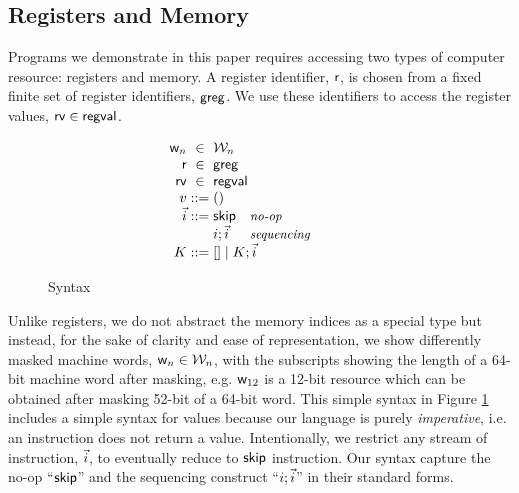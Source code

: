 \subsection{Registers and Memory}
Programs we demonstrate in this paper requires accessing two types of computer resource: registers and memory.
 A register identifier, $\mathsf{r}$, is chosen from a fixed finite set of register identifiers, $\mathsf{greg}$. 
We use these identifiers to access the register values, $\mathsf{rv} \in \mathsf{regval}$.
\begin{figure}[t]
\newcommand{\commentary}[1]{ & \text{\small\it #1} \\}
\[
  \begin{array}{r@{\;}c@{\;}l}
    \loc & \in & \Loc \\
    \reg & \in & \regset \\
    \regval & \in & \regvaltype \\
    \val & ::= & \vunit

\\
    \instrs & ::= &
    \begin{array}[t]{@{}l@{\hspace{10mm}}l@{}}
    \begin{array}[t]{@{}ll@{}}
      \iskip
                   \commentary{no-op}
      \iseq\instr\instrs
                   \commentary{sequencing}
    \end{array}
    \end{array}
    \\

    \ectx & ::= &
      \hole \mid
      \iseq\ectx\instrs 
    \\
  \end{array}
\]
\caption{Syntax}
\label{fig:syntax}
\end{figure}
Unlike registers, we do not abstract the memory indices as a special type but instead, for the sake of clarity and ease of representation, we show differently masked machine words, $\mathsf{w}_n \in \mathcal{W}_n$, with the subscripts showing the length of a 64-bit machine word after masking, e.g. $\mathsf{w}_{12}$ is a 12-bit resource which can be obtained after masking 52-bit of a 64-bit word.
This simple syntax in Figure \ref{fig:syntax} includes a simple syntax for values because our language is purely \textit{imperative}, i.e. an instruction does not return a value. Intentionally, we restrict any stream of instruction, $\vec{i}$, to eventually reduce to $\mathsf{skip}$ instruction. Our syntax capture the no-op ``$\mathsf{skip}$'' and the sequencing construct ``$i; \vec{i}$'' in their standard forms.
